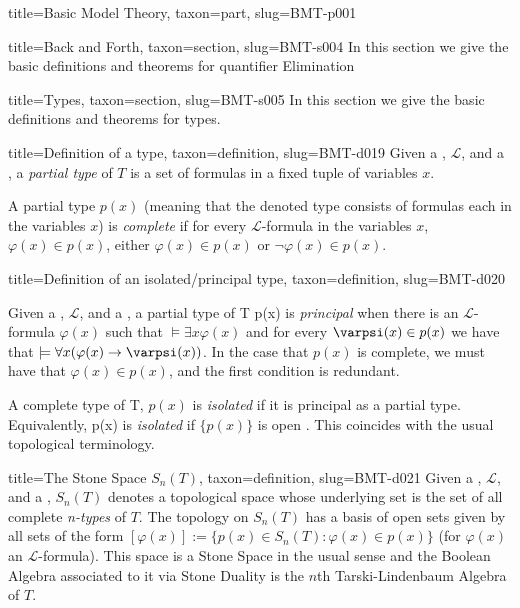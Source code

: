 \documentclass[a4paper]{article}
\begin{document}
\begin{tree}{title={Basic Model Theory}, taxon={part}, slug={BMT-p001}}
  
  
\begin{tree}{title={Back and Forth}, taxon={section}, slug={BMT-s004}}
In this section we give the basic definitions and theorems for quantifier Elimination
\end{tree}


  
  
\begin{tree}{title={Types}, taxon={section}, slug={BMT-s005}}
In this section we give the basic definitions and theorems for types.
\begin{tree}{title={Definition of a type}, taxon={definition}, slug={BMT-d019}}
Given a , \(\mathcal {L}\), and a , a \emph{partial type} of \(T\) is a  set of formulas in a fixed tuple of variables \(x\).\par{A partial type \(p(x)\) (meaning that the denoted type consists of formulas each in the variables \(x\)) is \emph{complete} if for every \(\mathcal {L}\)-formula in the variables \(x\), \(\varphi (x) \in  p(x)\), either \(\varphi (x) \in  p(x)\) or \(\neg   \varphi (x) \in  p(x)\).}
\end{tree}

\begin{tree}{title={Definition of an isolated/principal type}, taxon={definition}, slug={BMT-d020}}

    Given a , \(\mathcal {L}\), and a ,
    a partial type of T {p(x)} is \emph{principal} when there is an \(\mathcal {L}\)-formula \(\varphi (x)\) such that
    \(\models   \exists  x  \varphi (x)\) and for every \(\varpsi (x)  \in  p(x)\) we have that
    \(\models   \forall  x ( \varphi (x)  \rightarrow   \varpsi (x))\).
    In the case that \(p(x)\) is complete, we must have that \(\varphi (x) \in  p(x)\),
    and the first condition is redundant.
\par{
    A complete type of T, \(p(x)\) is \emph{isolated} if it is principal as a partial type.
    Equivalently, {p(x)} is \emph{isolated} if \(\{ p(x) \}\) is open .
    This coincides with the usual topological terminology.
}
\end{tree}

\begin{tree}{title={The Stone Space \(S_n(T)\)}, taxon={definition}, slug={BMT-d021}}
Given a , \(\mathcal {L}\), and a ,
\(S_n(T)\) denotes a topological space whose underlying set is the set of all complete \emph{n-types} of \(T\).
The topology on \(S_n(T)\) has a basis of open sets given by all sets of the form \([ \varphi (x)] :=  \{ p(x) \in  S_n(T):
 \varphi (x)  \in  p(x) \}\) (for \(\varphi (x)\) an \(\mathcal {L}\)-formula).
This space is a Stone Space in the usual sense and the Boolean Algebra associated to it via Stone Duality is
the \(n\)th Tarski-Lindenbaum Algebra of \(T\).
\end{tree}


\end{tree}
\end{tree}
\end{document}
